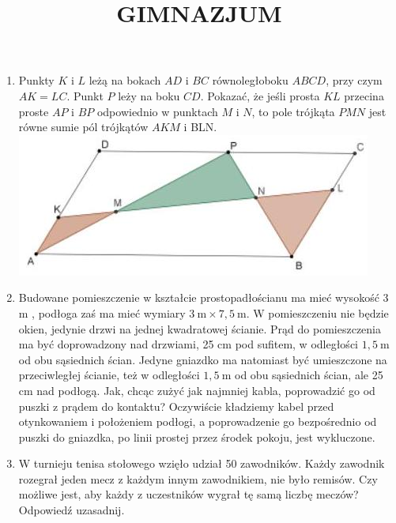 \documentclass[10pt]{article}
\title{GIMNAZJUM }
\author{}
\date{}
\begin{document}
\maketitle
\begin{enumerate}
  \item Punkty \(K\) i \(L\) leżą na bokach \(A D\) i \(B C\) równoległoboku \(A B C D\), przy czym \(A K=L C\). Punkt \(P\) leży na boku \(C D\). Pokazać, że jeśli prosta \(K L\) przecina proste \(A P\) i \(B P\) odpowiednio w punktach \(M\) i \(N\), to pole trójkąta \(P M N\) jest równe sumie pól trójkątów \(A K M\) i BLN.\\
\includegraphics[max width=\textwidth, center]{2024_11_21_c99ffd375c316295e466g-1}
  \item Budowane pomieszczenie w kształcie prostopadłościanu ma mieć wysokość 3 m , podłoga zaś ma mieć wymiary \(3 \mathrm{~m} \times 7,5 \mathrm{~m}\). W pomieszczeniu nie będzie okien, jedynie drzwi na jednej kwadratowej ścianie. Prąd do pomieszczenia ma być doprowadzony nad drzwiami, 25 cm pod sufitem, w odległości \(1,5 \mathrm{~m}\) od obu sąsiednich ścian. Jedyne gniazdko ma natomiast być umieszczone na przeciwległej ścianie, też w odległości \(1,5 \mathrm{~m}\) od obu sąsiednich ścian, ale 25 cm nad podłogą. Jak, chcąc zużyć jak najmniej kabla, poprowadzić go od puszki z prądem do kontaktu? Oczywiście kładziemy kabel przed otynkowaniem i położeniem podłogi, a poprowadzenie go bezpośrednio od puszki do gniazdka, po linii prostej przez środek pokoju, jest wykluczone.
  \item W turnieju tenisa stołowego wzięło udział 50 zawodników. Każdy zawodnik rozegrał jeden mecz z każdym innym zawodnikiem, nie było remisów. Czy możliwe jest, aby każdy z uczestników wygrał tę samą liczbę meczów? Odpowiedź uzasadnij.
\end{enumerate}
\end{document}
